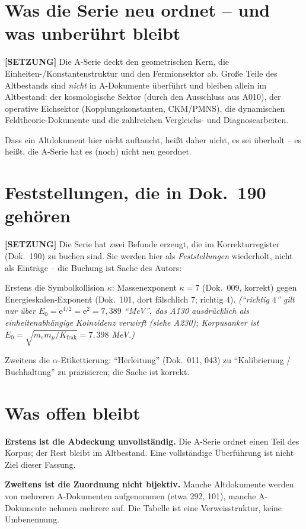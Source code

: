 \section{Was die Serie neu ordnet -- und was unberührt bleibt}

\textbf{[SETZUNG]} Die A-Serie deckt den geometrischen Kern, die
Einheiten-/Konstantenstruktur und den Fermionsektor ab. Große Teile des
Altbestands sind \emph{nicht} in A-Dokumente überführt und bleiben allein im
Altbestand: der kosmologische Sektor (durch den Ausschluss aus A010), der
operative Eichsektor (Kopplungskonstanten, CKM/PMNS), die dynamischen Feldtheorie-Dokumente und die zahlreichen
Vergleichs- und Diagnosearbeiten.

Dass ein Altdokument hier nicht auftaucht, heißt daher nicht, es sei überholt --
es heißt, die A-Serie hat es (noch) nicht neu geordnet.

\section{Feststellungen, die in Dok.~190 gehören}

\textbf{[SETZUNG]} Die Serie hat zwei Befunde erzeugt, die im Korrekturregister
(Dok.~190) zu buchen sind. Sie werden hier als \emph{Feststellungen}
wiederholt, nicht als Einträge -- die Buchung ist Sache des Autors:

Erstens die Symbolkollision $\kappa$: Massenexponent $\kappa=7$ (Dok.~009,
korrekt) gegen Energieskalen-Exponent (Dok.~101, dort fälschlich $7$; richtig
$4$). \textit{(\enquote{richtig $4$} gilt nur über $E_0=\mathrm{e}^{4/2}=\mathrm{e}^2=7{,}389$ \enquote{MeV}, das A130 ausdrücklich als einheitenabhängige Koinzidenz verwirft (siehe A230); Korpusanker ist $E_0=\sqrt{m_em_\mu/K_\text{frak}}=7{,}398$ MeV.)}

Zweitens die $\alpha$-Etikettierung: \enquote{Herleitung} (Dok.~011, 043) zu
\enquote{Kalibrierung / Buchhaltung} zu präzisieren; die Sache ist korrekt.

\section{Was offen bleibt}

\textbf{Erstens ist die Abdeckung unvollständig.} Die A-Serie ordnet einen Teil
des Korpus; der Rest bleibt im Altbestand. Eine vollständige Überführung ist
nicht Ziel dieser Fassung.

\textbf{Zweitens ist die Zuordnung nicht bijektiv.} Manche Altdokumente werden
von mehreren A-Dokumenten aufgenommen (etwa 292, 101), manche A-Dokumente nehmen
mehrere auf. Die Tabelle ist eine Verweisstruktur, keine Umbenennung.

